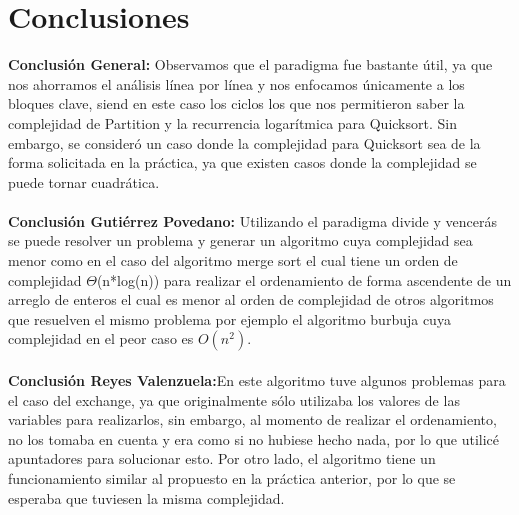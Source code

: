 \documentclass[12pt,twoside]{article}
\begin{document}
\section{Conclusiones}
\textbf{Conclusi\'on General: }Observamos que el paradigma fue bastante \'util, ya que nos ahorramos el an\'alisis l\'inea por l\'inea y nos enfocamos \'unicamente a los bloques clave, siend en este caso los ciclos los que nos permitieron saber la complejidad de Partition y la recurrencia logar\'itmica para Quicksort. Sin embargo, se consider\'o un caso donde la complejidad para Quicksort sea de la forma solicitada en la pr\'actica, ya que existen casos donde la complejidad se puede tornar cuadr\'atica.\\\\
\textbf{Conclusi\'on Guti\'errez Povedano: }Utilizando el paradigma divide y vencerás se puede resolver un problema y generar un algoritmo cuya complejidad sea menor como en el caso del algoritmo merge sort el cual tiene un orden de complejidad $\Theta$(n*log(n)) para realizar el ordenamiento de forma ascendente de un arreglo de enteros el cual es menor al orden de complejidad de otros algoritmos que resuelven el mismo problema por ejemplo el algoritmo burbuja cuya complejidad en el peor caso es $O(n^{2})$.\\\\
\textbf{Conclusi\'on Reyes Valenzuela:}En este algoritmo tuve algunos problemas para el caso del exchange, ya que originalmente s\'olo utilizaba los valores de las variables para realizarlos, sin embargo, al momento de realizar el ordenamiento, no los tomaba en cuenta y era como si no hubiese hecho nada, por lo que utilic\'e apuntadores para solucionar esto. Por otro lado, el algoritmo tiene un funcionamiento similar al propuesto en la pr\'actica anterior, por lo que se esperaba que tuviesen la misma complejidad.\\\\
\end{document}
